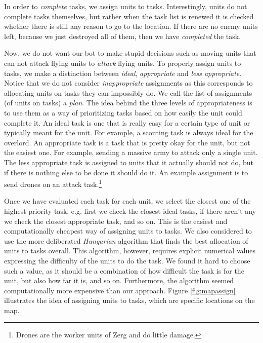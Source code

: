 In order to \emph{complete} tasks, we assign units to tasks. Interestingly, units do not complete tasks themselves, but rather when the task list is renewed it is checked whether there is still any reason to go to the location. If there are no enemy units left, because we just destroyed all of them, then we have \emph{completed} the task.

Now, we do not want our bot to make stupid decisions such as moving units that can not attack flying units to \emph{attack} flying units. To properly assign units to tasks, we make a distinction between \emph{ideal}, \emph{appropriate} and \emph{less appropriate}. Notice that we do not consider \emph{inappropriate} assignments as this corresponds to allocating units on tasks they can impossibly do. We call the list of assignments (of units on tasks) a \emph{plan}. The idea behind the three levels of appropriateness is to use them as a way of prioritizing tasks based on how easily the unit could complete it. An ideal task is one that is really easy for a certain type of unit or typically meant for the unit. For example, a scouting task is always ideal for the overlord. An appropriate task is a task that is pretty okay for the unit, but not the easiest one. For example, sending a massive army to attack only a single unit. The less appropriate task is assigned to units that it actually should not do, but if there is nothing else to be done it should do it. An example assignment is to send drones on an attack task.\footnote{Drones are the worker units of Zerg and do little damage.}

Once we have evaluated each task for each unit, we select the closest one of the highest priority task, e.g. first we check the closest ideal tasks, if there aren't any we check the closest appropriate task, and so on. This is the easiest and computationally cheapest way of assigning units to tasks. We also considered to use the more deliberated \emph{Hungarian} algorithm that finds the best allocation of units to tasks overall. This algorithm, however, requires explicit numerical values expressing the difficulty of the units to do the task. We found it hard to choose such a value, as it should be a combination of how difficult the task is for the unit, but also how far it is, and so on. Furthermore, the algorithm seemed computationally more expensive than our approach. Figure \ref{fig:mapassign} illustrates the idea of assigning units to tasks, which are specific locations on the map.

